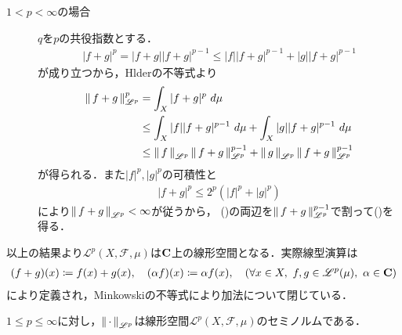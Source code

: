 \begin{prf}
\begin{description}
		\item[$1 < p < \infty$の場合]
			$q$を$p$の共役指数とする．
			\begin{align}
				|f+g|^p = |f+g||f+g|^{p-1} \leq |f||f+g|^{p-1} + |g||f+g|^{p-1}
			\end{align}
			が成り立つから，Hlderの不等式より
			\begin{align}
				\Norm{f+g}{\mathscr{L}^p}^p &= \int_{X} |f+ g|^p\ d\mu \\
				&\leq \int_{X} |f||f+g|^{p-1}\ d\mu + \int_{X} |g||f+g|^{p-1}\ d\mu \\
				&\leq \Norm{f}{\mathscr{L}^p}\Norm{f+g}{\mathscr{L}^p}^{p-1} + \Norm{g}{\mathscr{L}^p}\Norm{f+g}{\mathscr{L}^p}^{p-1}
				\label{Minkowski_1}
			\end{align}
			が得られる．また$|f|^p,|g|^p$の可積性と
			\begin{align}
				|f + g|^p \leq 2^p \left( |f|^p + |g|^p \right)
			\end{align}
			により$\left\|\, f+g\, \right\|_{\mathscr{L}^p} < \infty$が従うから，
			()の両辺を$\left\|\, f+g\, \right\|_{\mathscr{L}^p}^{p-1}$で割って()を得る．
			\QED
	\end{description}
\end{prf}

以上の結果より$\mathscr{L}^p(X,\mathscr{F},\mu)$は$\mathbf{C}$上の線形空間となる．実際線型演算は
\begin{align}
	(f+g)(x) \coloneqq f(x) + g(x), \quad (\alpha f)(x) \coloneqq \alpha f(x),
	\quad (\forall x \in X,\ f,g \in \mathscr{L}^p(\mu),\ \alpha \in \mathbf{C})
\end{align}
により定義され，Minkowskiの不等式により加法について閉じている．

\begin{screen}
	\begin{lem}
		$1 \leq p \leq \infty$に対し，$\left\|\, \cdot\, \right\|_{\mathscr{L}^p}$は線形空間$\mathscr{L}^p(X,\mathscr{F},\mu)$のセミノルムである．
	\end{lem}
\end{screen}

